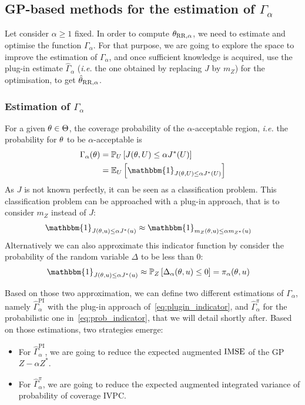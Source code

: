 \documentclass[../../Main_ManuscritThese.tex]{subfiles}
\begin{document}
\subsection{GP-based methods for the estimation of $\Gamma_{\alpha}$}
\label{sec:evaluation_gamma}
Let consider $\alpha\geq 1$ fixed. In order to compute
${\theta}_{\mathrm{RR, \alpha}}$, we need to estimate and optimise the
function $\Gamma_{\alpha}$. For that purpose, we are going to explore
the space to improve the estimation of $\Gamma_{\alpha}$, and once
sufficient knowledge is acquired, use the plug-in estimate
$\hat{\Gamma}_{\alpha}$ (\emph{i.e.} the one obtained by replacing $J$
by $m_Z$) for the optimisation, to get
$\hat{\theta}_{\mathrm{RR},\alpha}$.

\subsubsection{Estimation of $\Gamma_{\alpha}$}

For a given $\theta\in\Theta$, the coverage probability of the
$\alpha$-acceptable region, \emph{i.e.} the probability for $\theta$ to be
$\alpha$-acceptable is
\begin{align}
  \Gamma_{\alpha}(\kk)  & = \Prob_{U}\left[J(\kk,\UU) \leq \alpha J^*(\UU)\right] \\
                      & =\Ex_{U}\left[\mathbbm{1}_{J(\kk,\UU) \leq \alpha J^*(\UU)}\right]
\end{align}
As $J$ is not known perfectly, it can be seen as a classification
problem.  This classification problem can be approached with a plug-in
approach, that is to consider $m_Z$ instead of $J$:
\begin{align}
  \mathbbm{1}_{J(\kk,\uu) \leq \alpha J^*(\uu)} & \approx   \mathbbm{1}_{m_Z(\kk,\uu) \leq \alpha m_{{Z^*}}(\uu)} \label{eq:plugin_indicator}
\end{align}
Alternatively we can also approximate this indicator function by
consider the probability of the random variable $\Delta$ to be less
than $0$:
\begin{align}
  \mathbbm{1}_{J(\kk,\uu) \leq \alpha J^*(\uu)} & \approx   \Prob_{Z}\left[ \Delta_{\alpha}(\kk,\uu) \leq 0 \right] = \pi_{\alpha}(\kk,\uu) \label{eq:prob_indicator}
\end{align}

Based on those two approximation, we can define two different
estimations of $\Gamma_\alpha$, namely
$\hat{\Gamma}_\alpha^{\mathrm{PI}}$ with the plug-in approach
of~\cref{eq:plugin_indicator}, and $\hat{\Gamma}_{\alpha}^{\pi}$ for
the probabilistic one in~\cref{eq:prob_indicator}, that we will detail
shortly after. Based on those estimations, two strategies emerge:
\begin{itemize}
\item For $\hat{\Gamma}_{\alpha}^{\mathrm{PI}}$, we are going to
  reduce the expected augmented $\operatorname{\mathrm{IMSE}}$ of the GP $Z - \alpha Z^*$.
\item For $\hat{\Gamma}_{\alpha}^{\pi}$, we are going to reduce the
  expected augmented integrated variance of probability of coverage
  $\mathrm{IVPC}$.
\end{itemize}
\end{document}

